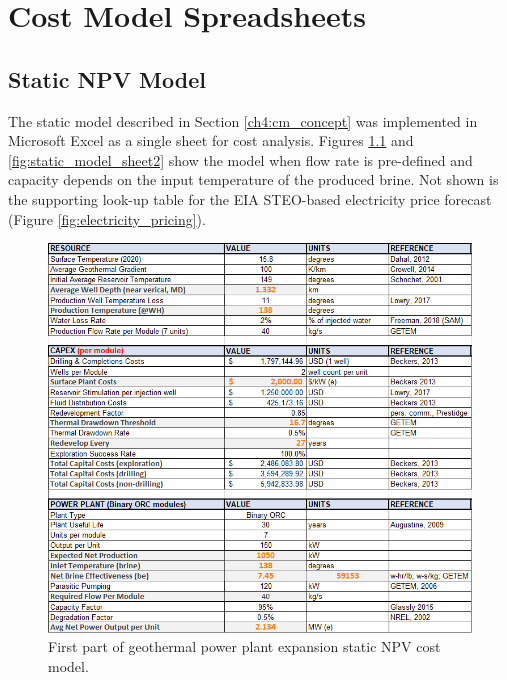 \chapter{Cost Model Spreadsheets}\label{app:B_cost_model_spreadsheets}

\section{Static NPV Model}\label{app:B_static_model}
The static model described in Section \ref{ch4:cm_concept} was implemented in Microsoft Excel as a single sheet for cost analysis. Figures \ref{fig:static_model_sheet1} and \ref{fig:static_model_sheet2} show the model when flow rate is pre-defined and capacity depends on the input temperature of the produced brine. Not shown is the supporting look-up table for the EIA STEO-based electricity price forecast (Figure \ref{fig:electricity_pricing}).
\vfill
\pagebreak

\begin{figure}[H]
\centering
\includegraphics[width=\textwidth]{templates/images/Figure-Static_Model_SheetA.png}
\caption[Static cost model worksheet (part 1)]{First part of geothermal power plant expansion static NPV cost model.}
\label{fig:static_model_sheet1}
\end{figure}

